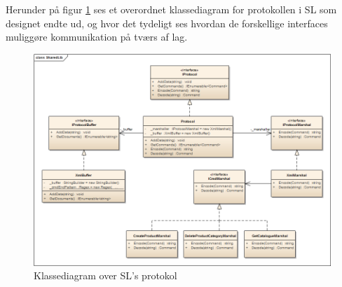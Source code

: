 Herunder på figur \ref{fig:overklasseSL} ses et overordnet klassediagram for protokollen i \gls{SL} som designet endte ud, og hvor det tydeligt ses hvordan de forskellige interfaces muliggøre kommunikation på tværs af lag.


\begin{figure}[H]
	\centering
	\includegraphics[width=1.0\textwidth]{Systemdesign/SharedLib/Images/SharedLib_Overordnet.png}
	\caption{Klassediagram over \gls{SL}'s protokol}
	\label{fig:overklasseSL}
\end{figure}









